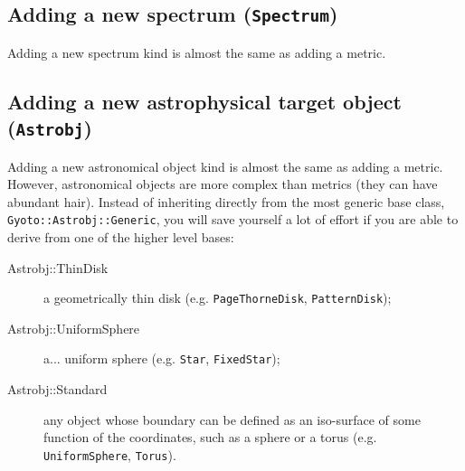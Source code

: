 \documentclass[a4paper,12pt]{article}
\newcommand{\Astrobj}{\texttt{Astrobj}}
\newcommand{\Spectrum}{\texttt{Spectrum}}
\begin{document}
\subsection{Adding a new spectrum (\Spectrum)}

Adding a new spectrum kind is almost the same as adding a metric.

\subsection{Adding a new astrophysical target object (\Astrobj)}
\label{newastrobj}

Adding a new astronomical object kind is almost the same as adding a
metric. However, astronomical objects are more complex than metrics
(they can have abundant hair). Instead of inheriting directly from the
most generic base class, \texttt{Gyoto::Astrobj::Generic}, you will
save yourself a lot of effort if you are able to derive from one of
the higher level bases:
\begin{description}
\item[Astrobj::ThinDisk] a geometrically thin disk
  (e.g. \texttt{PageThorneDisk}, \texttt{PatternDisk});
\item[Astrobj::UniformSphere] a... uniform sphere (e.g. \texttt{Star},
  \texttt{FixedStar});
\item[Astrobj::Standard] any object whose boundary can be defined as
  an iso-surface of some function of the coordinates, such as a sphere
  or a torus (e.g. \texttt{UniformSphere}, \texttt{Torus}).
\end{description}
\end{document}
